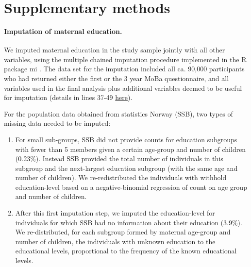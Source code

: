 \documentclass[12pt]{article}
\begin{document}
\tableofcontents

\section{Supplementary methods}

\paragraph{Imputation of maternal education.} We imputed maternal education in the study sample jointly with all other variables, using the multiple chained imputation procedure implemented in the R package mi \cite{Su2011-he}. The data set for the imputation included all ca. 90,000 participants who had returned  either the first or the 3 year MoBa questionnaire, and all variables used in the final analysis plus additional variables deemed to be useful for imputation (details in lines 37-49 \href{https://github.com/gbiele/IPW/blob/master/AnalysisBIPW/021\_mi\_utils.R}{here}).

For the population data obtained from statistics Norway (SSB), two types of missing data needed to be imputed: 
\begin{enumerate}
	\item For small sub-groups, SSB did not provide counts for education subgroups with fewer than 5 members given a certain age-group and number of children (0.23\%). Instead SSB provided the total number of individuals in this subgroup and the next-largest education subgroup (with the same age and number of children). We re-redistributed the individuals with withhold education-level based on a negative-binomial regression of count on age group and number of children.
	\item After this first imputation step, we imputed the education-level for individuals for which SSB had no information about their education (3.9\%). We re-distributed, for each subgroup formed by maternal age-group and number of children, the individuals with unknown education to the educational levels, proportional to the frequency of the known educational levels. 
\end{enumerate}
\end{document}
